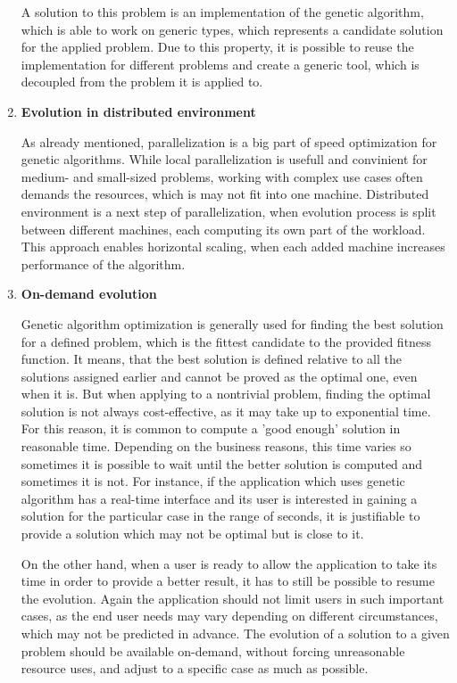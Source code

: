 \begin{enumerate}
A solution to this problem is an implementation of the genetic algorithm, which is able to work on generic types, which represents a candidate solution for the applied problem. Due to this property, it is possible to reuse the implementation for different problems and create a generic tool, which is decoupled from the problem it is applied to.
\medbreak

\item \textbf{Evolution in distributed environment}

As already mentioned, parallelization is a big part of speed optimization for genetic algorithms. While local parallelization is usefull and convinient for medium- and small-sized problems, working with complex use cases often demands the resources, which is may not fit into one machine. Distributed environment is a next step of parallelization, when evolution process is split between different machines, each computing its own part of the workload. This approach enables horizontal scaling, when each added machine increases performance of the algorithm.  
\medbreak

\item \textbf{On-demand evolution}

Genetic algorithm optimization is generally used for finding the best solution for a defined problem, which is the fittest candidate to the provided fitness function. It means, that the best solution is defined relative to all the solutions assigned earlier and cannot be proved as the optimal one, even when it is. But when applying to a nontrivial problem, finding the optimal solution is not always cost-effective, as it may take up to exponential time. For this reason, it is common to compute a 'good enough' solution in reasonable time. Depending on the business reasons, this time varies so sometimes it is possible to wait until the better solution is computed and sometimes it is not. For instance, if the application which uses genetic algorithm has a real-time interface and its user is interested in gaining a solution for the particular case in the range of seconds, it is justifiable to provide a solution which may not be optimal but is close to it.

On the other hand, when a user is ready to allow the application to take its time in order to provide a better result, it has to still be possible to resume the evolution. Again the application should not limit users in such important cases, as the end user needs may vary depending on different circumstances, which may not be predicted in advance. The evolution of a solution to a given problem should be available on-demand, without forcing unreasonable resource uses, and adjust to a specific case as much as possible.
\medbreak
\end{enumerate}